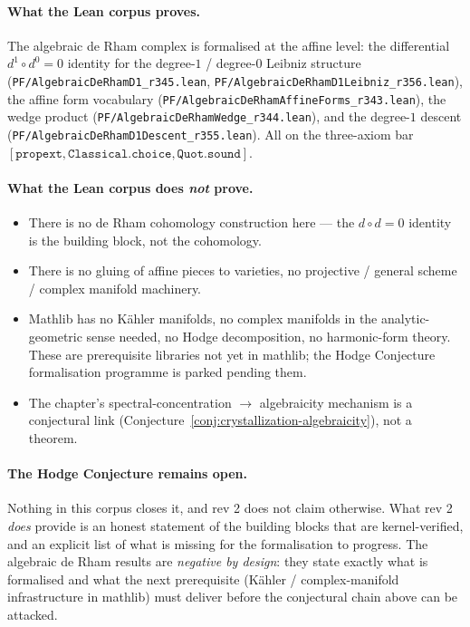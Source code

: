 \paragraph{What the Lean corpus proves.}  The algebraic de Rham complex
is formalised at the affine level: the differential $d^1 \circ d^0 = 0$
identity for the degree-$1$ / degree-$0$ Leibniz structure
(\texttt{PF/AlgebraicDeRhamD1\_r345.lean},
\texttt{PF/AlgebraicDeRhamD1Leibniz\_r356.lean}), the affine form
vocabulary (\texttt{PF/AlgebraicDeRhamAffineForms\_r343.lean}), the
wedge product (\texttt{PF/AlgebraicDeRhamWedge\_r344.lean}), and the
degree-$1$ descent (\texttt{PF/AlgebraicDeRhamD1Descent\_r355.lean}).
All on the three-axiom bar $[\mathtt{propext},
\mathtt{Classical.choice}, \mathtt{Quot.sound}]$.

\paragraph{What the Lean corpus does \emph{not} prove.}
\begin{itemize}
\item There is no de Rham cohomology construction here --- the
  $d \circ d = 0$ identity is the building block, not the cohomology.
\item There is no gluing of affine pieces to varieties, no projective
  / general scheme / complex manifold machinery.
\item Mathlib has no Kähler manifolds, no complex manifolds in the
  analytic-geometric sense needed, no Hodge decomposition, no
  harmonic-form theory.  These are prerequisite libraries not yet in
  mathlib; the Hodge Conjecture formalisation programme is parked
  pending them.
\item The chapter's spectral-concentration $\to$ algebraicity mechanism
  is a conjectural link (Conjecture~\ref{conj:crystallization-algebraicity}),
  not a theorem.
\end{itemize}

\paragraph{The Hodge Conjecture remains open.}  Nothing in this corpus
closes it, and rev 2 does not claim otherwise.  What rev 2 \emph{does}
provide is an honest statement of the building blocks that are
kernel-verified, and an explicit list of what is missing for the
formalisation to progress.  The algebraic de Rham results are
\emph{negative by design}: they state exactly what is formalised and
what the next prerequisite (Kähler / complex-manifold infrastructure
in mathlib) must deliver before the conjectural chain above can be
attacked.

